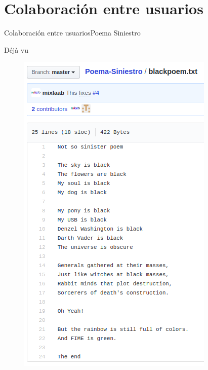 \documentclass[10pt]{beamer}
\begin{document}
\section{Colaboración entre usuarios}

\begin{frame}{Colaboración entre usuarios}{Poema Siniestro}

\begin{block}{Déjà vu}
\vspace{-0.2in}
\begin{figure}[h!]
\centering
\includegraphics [scale=0.33]{step1}
\label{fig:step1}
\end{figure}
    
\end{block}
\end{frame}

\end{document}
